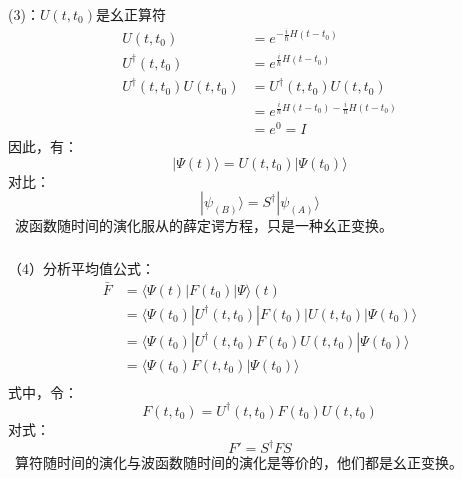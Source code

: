 \begin{frame}  
    (3)：$ U(t,t_0)$是幺正算符
    $$ \begin{aligned}
        U(t,t_0)  &= e^{-\frac{i}{\hbar} H(t-t_0)}  \\
        U^\dagger (t,t_0)  &= e^{\frac{i}{\hbar} H(t-t_0)}  \\
        U^\dagger (t,t_0)U(t,t_0) &= U^\dagger (t,t_0)U(t,t_0) \\
         &=e^{\frac{i}{\hbar} H(t-t_0)-\frac{i}{\hbar} H(t-t_0)} \\
         &=e^0=I
    \end{aligned} $$
    因此，有：
    $$ |\Psi(t)\rangle = U(t,t_0) |\Psi(t_0)\rangle   $$
    对比： 
    $$ |\psi_{(B)}\rangle = S^\dagger |\psi_{(A)}\rangle $$
    \Note ~波函数随时间的演化服从的薛定谔方程，只是一种幺正变换。
\end{frame} 

\begin{frame}  
    \frametitle{} 
    （4）分析平均值公式：
    $$ \begin{aligned}
        \bar{F} &= \langle \Psi(t) |F(t_0) | \Psi \rangle(t)  \\
        &= \langle \Psi(t_0) |U^\dagger (t,t_0) |F(t_0) | U(t,t_0) |\Psi(t_0)\rangle   \\
        &= \langle \Psi(t_0) |U^\dagger (t,t_0) F(t_0) U(t,t_0) |\Psi(t_0)\rangle   \\
        &= \langle \Psi(t_0) F(t,t_0) |\Psi(t_0)\rangle   \\
    \end{aligned} $$
     式中，令： $$ F(t,t_0) =U^\dagger (t,t_0) F(t_0) U(t,t_0)$$
     对式：
     $$F'=S^\dagger F S $$
     \Note ~算符随时间的演化与波函数随时间的演化是等价的，他们都是幺正变换。
\end{frame} 

